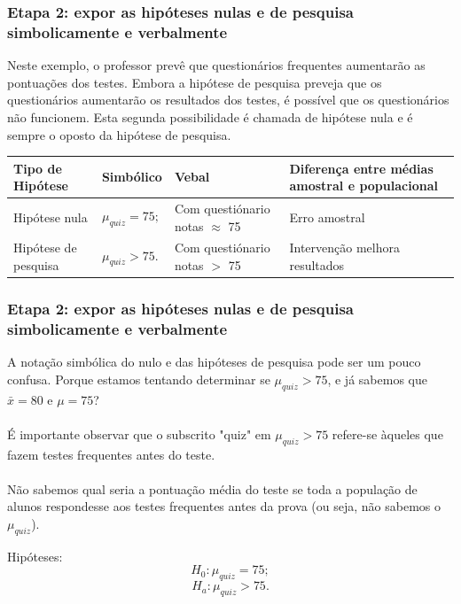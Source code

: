 \documentclass[11pt]{beamer}
\begin{document}
\begin{frame}
\frametitle{Etapa 2: expor as hipóteses nulas e de pesquisa simbolicamente e verbalmente}

Neste exemplo, o professor prevê que questionários frequentes aumentarão as pontuações dos testes. Embora a hipótese de pesquisa preveja que os questionários aumentarão os resultados dos testes, é possível que os questionários não funcionem. Esta segunda possibilidade é chamada de hipótese nula e é sempre o oposto da hipótese de pesquisa.

\begin{center}
\begin{tabular}{ m{2cm}|m{2cm}|m{3cm}|m{3cm} } 
 \hline
 Tipo de Hipótese & Simbólico & Vebal & Diferença entre médias amostral e populacional\\
  \hline
 Hipótese nula & $\mu_{quiz}=75;$ & Com questiónario notas $\approx$ 75 & Erro amostral \\ 
 Hipótese de pesquisa & $\mu_{quiz}>75.$ & Com questiónario notas $>$ 75 & Intervenção melhora resultados  \\ 
 \hline
 \hline
\end{tabular}
\end{center}

\end{frame}

\begin{frame}
\frametitle{Etapa 2: expor as hipóteses nulas e de pesquisa simbolicamente e verbalmente}
A notação simbólica do nulo e das hipóteses de pesquisa pode ser um pouco confusa. Porque estamos tentando determinar se $\mu_{quiz} > 75$, e já sabemos que $\bar{x} = 80$ e $\mu = 75$? \\~\\
É importante observar que o subscrito "quiz" em $\mu_{quiz} > 75$ refere-se àqueles que fazem testes frequentes antes do teste.\\~\\

Não sabemos qual seria a pontuação média do teste se toda a população de alunos respondesse aos testes frequentes antes da prova (ou seja, não sabemos o $\mu_{quiz}$).

Hipóteses: 
\[H_0: \mu_{quiz}=75;\] 
\[H_a: \mu_{quiz}>75.\]

\end{frame}
\end{document}
